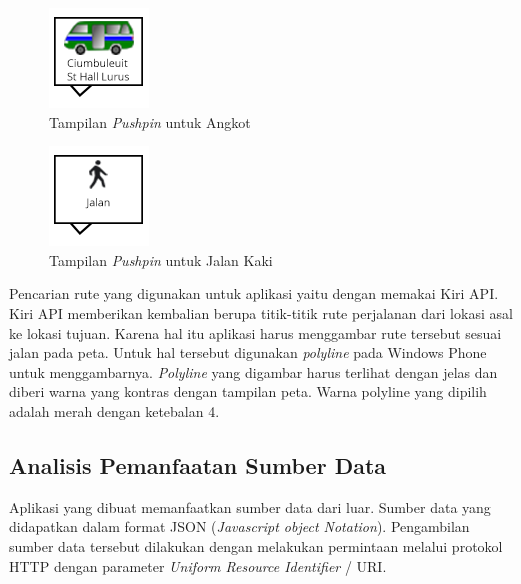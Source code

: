 \begin{figure}[h]
	\centering
		\includegraphics[scale=0.5]{Gambar/out_kiri/angkot}
	\caption{Tampilan \textit{Pushpin} untuk Angkot}
	\label{fig:pushpin_angkot}
\end{figure}

\begin{figure}[h]
	\centering
		\includegraphics[scale=0.5]{Gambar/out_kiri/jalan}
	\caption{Tampilan \textit{Pushpin} untuk Jalan Kaki}
	\label{fig:pushpin_jalan}
\end{figure}

Pencarian rute yang digunakan untuk aplikasi yaitu dengan memakai Kiri API. Kiri API memberikan kembalian berupa titik-titik rute perjalanan dari lokasi asal ke lokasi tujuan. Karena hal itu aplikasi harus menggambar rute tersebut sesuai jalan pada peta. Untuk hal tersebut digunakan \textit{polyline} pada Windows Phone untuk menggambarnya. \textit{Polyline} yang digambar harus terlihat dengan jelas dan diberi warna yang kontras dengan tampilan peta. Warna polyline yang dipilih adalah merah dengan ketebalan 4.

\subsection{Analisis Pemanfaatan Sumber Data}
\label{lab:Analisis Pemanfaatan Sumber Data}
\hspace{0.5cm} Aplikasi yang dibuat memanfaatkan sumber data dari luar. Sumber data yang didapatkan dalam format JSON (\textit{Javascript object Notation}). Pengambilan sumber data tersebut dilakukan dengan melakukan permintaan melalui protokol HTTP dengan parameter \textit{Uniform Resource Identifier} / URI. 

